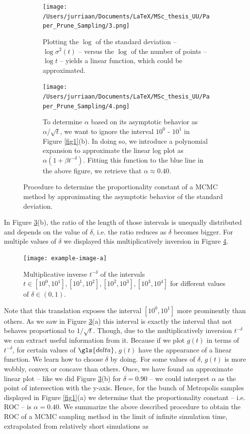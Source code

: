 \documentclass[a4paper, twoside, 11pt]{report}
\theoremstyle{plain}
\theoremstyle{definition}
\theoremstyle{remark}
\begin{document}
\begin{figure}[H]
\begin{subfigure}[t]{0.5\textwidth}
  \centering
  \captionsetup{width = 0.9\textwidth}
  \texttt{[image: /Users/jurriaan/Documents/LaTeX/MSc\_thesis\_UU/Paper\_Prune\_Sampling/3.png]}
  \caption{Plotting the $\log$ of the standard deviation -- $\log {\sigma}^2(t)$ -- versus the $\log$ of the number of points -- $\log t$ -- yields a linear function, which could be approximated.}
  \label{sub_2a}
\end{subfigure}%
\begin{subfigure}[t]{0.5\textwidth}
  \centering
  \captionsetup{width = 0.9\textwidth}
  \texttt{[image: /Users/jurriaan/Documents/LaTeX/MSc\_thesis\_UU/Paper\_Prune\_Sampling/4.png]}
  \caption{To determine $\alpha$ based on its asymptotic behavior as $\alpha / \sqrt{t}$, we want to ignore the interval $10^0$ - $10^1$ in Figure \ref{fig1}(b). In doing so, we introduce a polynomial expansion to approximate the linear log plot as $\alpha(1+\beta t^{-\delta})$. Fitting this function to the blue line in the above figure, we retrieve that $\alpha \approx 0.40$. }
  \label{sub_2b}
\end{subfigure}
\caption{Procedure to determine the proportionality constant of a MCMC method by approximating the asymptotic behavior of the standard deviation.}
\label{fig2}
\end{figure}
In Figure \ref{fig2}(b), the ratio of the length of those intervals is unequally distributed and depends on the value of $\delta$, i.e. the ratio reduces as $\delta$ becomes bigger. For multiple values of $\delta$ we displayed this multiplicatively inversion in Figure \ref{fig3}.
\begin{figure}[H]
\centering
\captionsetup{width = 0.9\textwidth}
\texttt{[image: example-image-a]}
\caption{Multiplicative inverse $t^{-\delta}$ of the intervals $t \in [10^0,10^1], [10^1,10^2], [10^2,10^3], [10^3,10^4]$ for different values of $\delta \in (0,1)$. }
\label{fig3}
\end{figure}
Note that this translation exposes the interval $[10^0,10^1]$ more prominently than others. As we saw in Figure \ref{fig2}(a) this interval is exactly the interval that not behaves proportional to $1 / \sqrt{t}$. Though, due to the multiplicatively inversion $t^{-\delta}$ we can extract useful information from it. Because if we plot $g(t)$ in terms of $t^{-\delta}$, for certain values of $\gls{delta}$, $g(t)$ have the appearance of a linear function. We learn how to choose $\delta$ by doing. For some values of $\delta$, $g(t)$ is more wobbly, convex or concave than others. Once, we have found an approximate linear plot -- like we did Figure \ref{fig2}(b) for $\delta = 0.90$ -- we could interpret $\alpha$ as the point of intersection with the y-axis. Hence, for the bunch of Metropolis samples displayed in Figure \ref{fig1}(a) we determine that the proportionality constant -- i.e. ROC -- is $\alpha = 0.40$. We summarize the above described procedure to obtain the ROC of a MCMC sampling method in the limit of infinite simulation time, extrapolated from relatively short simulations as
\end{document}
